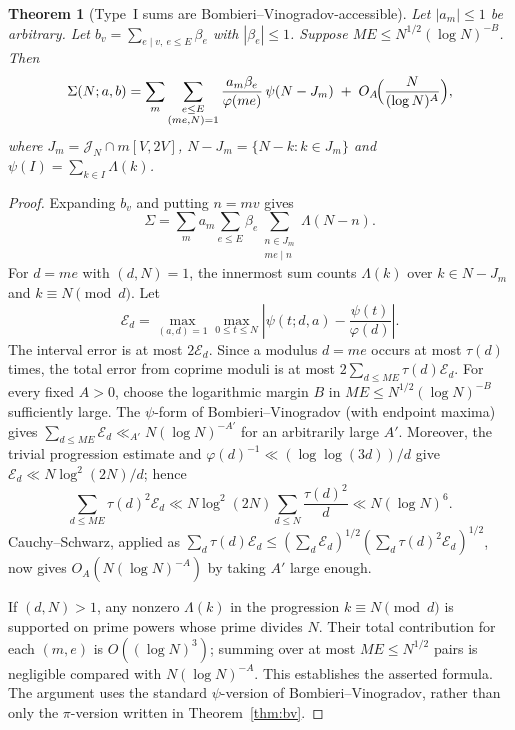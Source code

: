 \documentclass[final,11pt]{elsarticle}
\newtheorem{theorem}{Theorem}[section]
\theoremstyle{definition}
\theoremstyle{remark}
\newcommand{\cband}{\mathcal{J}_N}
\numberwithin{equation}{section}
\begin{document}
\begin{theorem}[Type~I sums are Bombieri--Vinogradov-accessible]\label{thm:typeI-sums}
Let $|a_m|\le1$ be arbitrary. Let $b_v=\sum_{e\mid v,\ e\le E}\beta_e$ with $|\beta_e|\le1$. Suppose $ME\le N^{1/2}(\log N)^{-B}$. Then
\[
\Sigma(N;a,b)=\sum_{m}\sum_{\substack{e\le E\\(me,N)=1}}\frac{a_m\beta_e}{\varphi(me)}\,\psi(N-J_m)\;+\;O_A\!\Bigl(\frac{N}{(\log N)^{A}}\Bigr),
\]
where $J_m=\cband\cap m[V,2V]$, $N-J_m=\{N-k:k\in J_m\}$ and $\psi(I)=\sum_{k\in I}\Lambda(k)$.
\end{theorem}

\begin{proof}
Expanding $b_v$ and putting $n=mv$ gives
\[
\Sigma=\sum_m a_m\sum_{e\le E}\beta_e
 \sum_{\substack{n\in J_m\\me\mid n}}\Lambda(N-n).
\]
For $d=me$ with $(d,N)=1$, the innermost sum counts
$\Lambda(k)$ over $k\in N-J_m$ and $k\equiv N\pmod d$.
Let
\[
\mathcal E_d=\max_{(a,d)=1}\max_{0\le t\le N}
 \left|\psi(t;d,a)-\frac{\psi(t)}{\varphi(d)}\right|.
\]
The interval error is at most $2\mathcal E_d$.  Since a modulus
$d=me$ occurs at most $\tau(d)$ times, the total error from
coprime moduli is at most $2\sum_{d\le ME}\tau(d)\mathcal E_d$.
For every fixed $A>0$, choose the logarithmic margin $B$ in
$ME\le N^{1/2}(\log N)^{-B}$ sufficiently large.  The
$\psi$-form of Bombieri--Vinogradov (with endpoint maxima) gives
$\sum_{d\le ME}\mathcal E_d\ll_{A'}N(\log N)^{-A'}$
for an arbitrarily large $A'$.  Moreover, the trivial progression
estimate and $\varphi(d)^{-1}\ll (\log\log(3d))/d$ give
$\mathcal E_d\ll N\log^2(2N)/d$; hence
\[
\sum_{d\le ME}\tau(d)^2\mathcal E_d
 \ll N\log^2(2N)\sum_{d\le N}\frac{\tau(d)^2}{d}
 \ll N(\log N)^6.
\]
Cauchy--Schwarz, applied as
$\sum_d\tau(d)\mathcal E_d\le
(\sum_d\mathcal E_d)^{1/2}
(\sum_d\tau(d)^2\mathcal E_d)^{1/2}$,
now gives $O_A(N(\log N)^{-A})$ by taking $A'$ large enough.

If $(d,N)>1$, any nonzero $\Lambda(k)$ in the progression
$k\equiv N\pmod d$ is supported on prime powers whose prime
divides $N$.  Their total contribution for each $(m,e)$ is
$O((\log N)^3)$; summing over at most $ME\le N^{1/2}$
pairs is negligible compared with $N(\log N)^{-A}$.
This establishes the asserted formula.  The argument uses the
standard $\psi$-version of Bombieri--Vinogradov, rather than
only the $\pi$-version written in Theorem~\ref{thm:bv}.
\end{proof}
\end{document}
